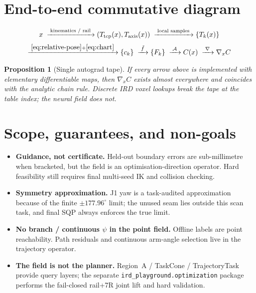 \documentclass[11pt,a4paper]{article}
\newtheorem{proposition}{Proposition}
\newcommand{\Tcp}{T_{\mathrm{tcp}}}
\newcommand{\Taxis}{T_{\mathrm{axis}}}
\begin{document}
\section{End-to-end commutative diagram}
\label{sec:diagram}

\[
\begin{array}{c}
x
\;\xrightarrow{\;\text{kinematics / rail}\;}
(\Tcp(x),\Taxis(x))
\;\xrightarrow{\;\text{local samples}\;}
\{T_{k}(x)\}
\\[0.6em]
\xrightarrow{\;\eqref{eq:relative-pose}+\eqref{eq:chart}\;}
\{c_{k}\}
\;\xrightarrow{\;\tilde f\;}
\{F_{k}\}
\;\xrightarrow{\;\mathcal{A}\;}
C(x)
\;\xrightarrow{\;\nabla\;}
\nabla_{x}C
\end{array}
\]

\begin{proposition}[Single autograd tape]
If every arrow above is implemented with elementary differentiable maps, then
\(\nabla_{x}C\) exists almost everywhere and coincides with the analytic
chain rule. Discrete IRD voxel lookups break the tape at the table index;
the neural field does not.
\end{proposition}

\section{Scope, guarantees, and non-goals}
\label{sec:scope}

\begin{itemize}[leftmargin=1.4em]
  \item \textbf{Guidance, not certificate.}
        Held-out boundary errors are sub-millimetre when bracketed, but the
        field is an optimisation-direction operator. Hard feasibility still
        requires final multi-seed IK and collision checking.
  \item \textbf{Symmetry approximation.}
        J1 yaw is a task-audited approximation because of the finite
        \(\pm177.96^\circ\) limit; the unused seam lies outside this scan task,
        and final SQP always enforces the true limit.
  \item \textbf{No branch / continuous \(\psi\) in the point field.}
        Offline labels are point reachability. Path residuals and continuous
        arm-angle selection live in the trajectory operator.
  \item \textbf{The field is not the planner.}
        Region~A / TaskCone / TrajectoryTask provide query layers; the separate
        \texttt{ird\_playground.optimization} package performs the fail-closed
        rail+7R joint lift and hard validation.
\end{itemize}
\end{document}
